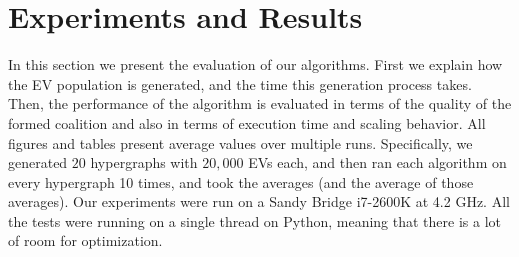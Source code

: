 
\chapter{Experiments and Results} %

\label{Chapter4} %








In this section we present the evaluation of our algorithms. First we explain how the EV population is generated, and the time this generation process takes. Then, the performance of the algorithm is evaluated in terms of the quality of the formed coalition and also in terms of execution time and scaling behavior. All figures and tables present average values over multiple runs. Specifically, we generated $20$ hypergraphs  with $20,000$ EVs each, and then ran each algorithm on every hypergraph 10 times, and took the averages (and the average of those averages).
Our experiments were run on a Sandy Bridge i7-2600K at 4.2 GHz. All the tests were running on a single thread on Python, meaning that there is a lot of room for optimization. %

